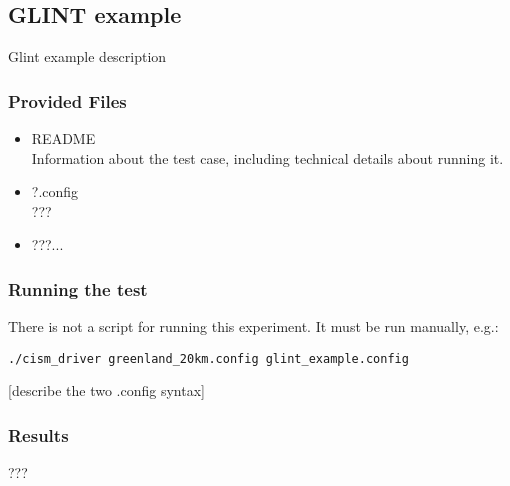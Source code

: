 \subsection{GLINT example}
Glint example description

\subsubsection{Provided Files}

\begin{itemize}
	\item README \\
		Information about the test case, including technical details about running it.
\item ?.config \\
  ???
\item ???... \\
\end{itemize}

\subsubsection{Running the test}
There is not a script for running this experiment.  It must be run manually, e.g.: 

\texttt{./cism\_driver greenland\_20km.config glint\_example.config}

[describe the two .config syntax]

\subsubsection{Results}
???


